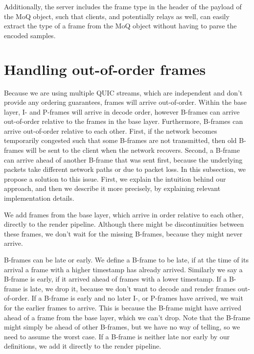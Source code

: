 Additionally, the server includes the frame type in the header of the payload of the MoQ object, such that clients, and potentially relays as well, can easily extract the type of a frame from the MoQ object without having to parse the encoded samples.

\section{Handling out-of-order frames}\label{section:out_of_order_frames}
Because we are using multiple QUIC streams, which are independent and don't provide any ordering guarantees, frames will arrive out-of-order. Within the base layer, I- and P-frames will arrive in decode order, however B-frames can arrive out-of-order relative to the frames in the base layer. Furthermore, B-frames can arrive out-of-order relative to each other. First, if the network becomes temporarily congested such that some B-frames are not transmitted, then old B-frames will be sent to the client when the network recovers. Second, a B-frame can arrive ahead of another B-frame that was sent first, because the underlying packets take different network paths or due to packet loss. %
In this subsection, we propose a solution to this issue. First, we explain the intuition behind our approach, and then we describe it more precisely, by explaining relevant implementation details.

We add frames from the base layer, which arrive in order relative to each other, directly to the render pipeline. Although there might be discontinuities between these frames, we don't wait for the missing B-frames, because they might never arrive.

B-frames can be late or early. We define a B-frame to be late, if at the time of its arrival a frame with a higher timestamp has already arrived. Similarly we say a B-frame is early, if it arrived ahead of frames with a lower timestamp. If a B-frame is late, we drop it, because we don't want to decode and render frames out-of-order. If a B-frame is early and no later I-, or P-frames have arrived, we wait for the earlier frames to arrive. This is because the B-frame might have arrived ahead of a frame from the base layer, which we can't drop. Note that the B-frame might simply be ahead of other B-frames, but we have no way of telling, so we need to assume the worst case. If a B-frame is neither late nor early by our definitions, we add it directly to the render pipeline. 

